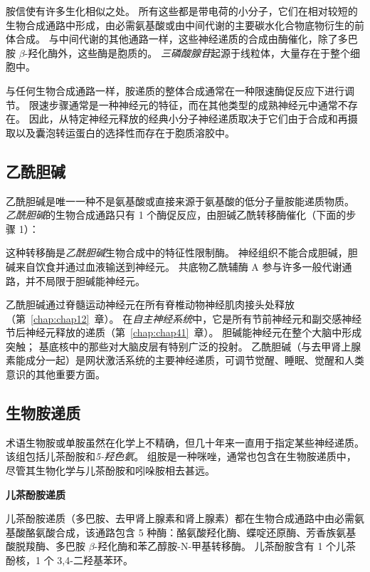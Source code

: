 胺信使有许多生化相似之处。
所有这些都是带电荷的小分子，它们在相对较短的生物合成通路中形成，由必需氨基酸或由中间代谢的主要碳水化合物底物衍生的前体合成。
与中间代谢的其他通路一样，这些神经递质的合成由酶催化，除了多巴胺 $\beta$-羟化酶外，这些酶是胞质的。
\textit{三磷酸腺苷}起源于线粒体，大量存在于整个细胞中。


与任何生物合成通路一样，胺递质的整体合成通常在一种限速酶促反应下进行调节。
限速步骤通常是一种神经元的特征，而在其他类型的成熟神经元中通常不存在。
因此，从特定神经元释放的经典小分子神经递质取决于它们由于合成和再摄取以及囊泡转运蛋白的选择性而存在于胞质溶胶中。



\subsection{乙酰胆碱}

乙酰胆碱是唯一一种不是氨基酸或直接来源于氨基酸的低分子量胺能递质物质。
\textit{乙酰胆碱}的生物合成通路只有 1 个酶促反应，由胆碱乙酰转移酶催化（下面的步骤 1）：


这种转移酶是\textit{乙酰胆碱}生物合成中的特征性限制酶。
神经组织不能合成胆碱，胆碱来自饮食并通过血液输送到神经元。
共底物乙酰辅酶 A 参与许多一般代谢通路，并不局限于胆碱能神经元。


乙酰胆碱通过脊髓运动神经元在所有脊椎动物神经肌肉接头处释放（第~\ref{chap:chap12}~章）。
在\textit{自主神经系统}中，它是所有节前神经元和副交感神经节后神经元释放的递质（第~\ref{chap:chap41}~章）。
胆碱能神经元在整个大脑中形成突触；
基底核中的那些对大脑皮层有特别广泛的投射。
乙酰胆碱（与去甲肾上腺素能成分一起）是网状激活系统的主要神经递质，可调节觉醒、睡眠、觉醒和人类意识的其他重要方面。




\subsection{生物胺递质}

术语生物胺或单胺虽然在化学上不精确，但几十年来一直用于指定某些神经递质。
该组包括儿茶酚胺和\textit{5-羟色氨}。
组胺是一种咪唑，通常也包含在生物胺递质中，尽管其生物化学与儿茶酚胺和吲哚胺相去甚远。


\textbf{儿茶酚胺递质}

儿茶酚胺递质（多巴胺、去甲肾上腺素和肾上腺素）都在生物合成通路中由必需氨基酸酪氨酸合成，该通路包含 5 种酶：酪氨酸羟化酶、蝶啶还原酶、芳香族氨基酸脱羧酶、多巴胺 $\beta$-羟化酶和苯乙醇胺-N-甲基转移酶。
儿茶酚胺含有 1 个儿茶酚核，1 个 3,4-二羟基苯环。


